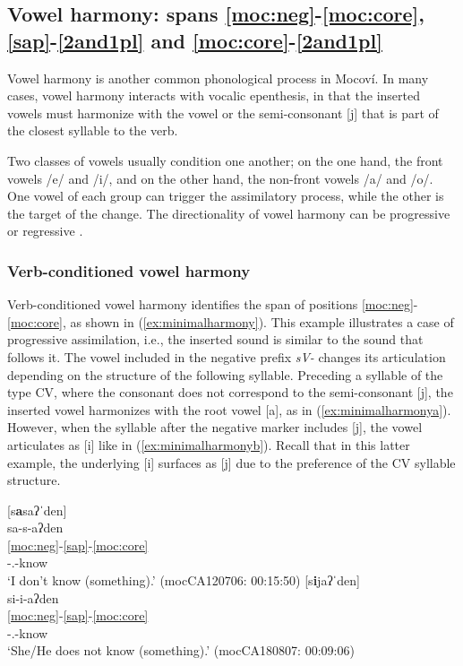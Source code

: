 \documentclass[output=paper]{langscibook}
\begin{document}
\subsection{Vowel harmony: spans \ref{moc:neg}-\ref{moc:core},  \ref{sap}-\ref{2and1pl} and \ref{moc:core}-\ref{2and1pl}}
\label{sec:vowel harmony}

 Vowel harmony is another common phonological process in Mocoví. In many cases, vowel harmony  interacts with vocalic epenthesis, in that the inserted vowels must harmonize with the vowel or the semi-consonant [j] that is part of the closest syllable to the verb.  %
 
 Two classes of vowels usually condition one another; on the one hand, the front vowels /e/ and /i/, and on the other hand, the non-front vowels /a/ and /o/. One vowel of each group can trigger the assimilatory process, while the other is the target of the change.  The directionality of vowel harmony can be progressive or regressive \citep[in the sense of][82]{Katamba1992}.

\subsubsection{Verb-conditioned vowel harmony}
Verb-conditioned vowel harmony identifies the span of positions \ref{moc:neg}-\ref{moc:core}, as shown in (\ref{ex:minimalharmony}). This example illustrates a case of progressive assimilation, i.e., the inserted sound is similar to the sound that follows it.  The vowel included in the negative prefix \textit{sV-} changes its articulation depending on the structure of the following syllable. Preceding a syllable of the type CV, where the consonant does not correspond to the semi-consonant [j], the inserted vowel harmonizes with the root vowel [a], as in (\ref{ex:minimalharmonya}). However, when the syllable after the negative marker includes [j], the vowel articulates as [i] like in (\ref{ex:minimalharmonyb}). Recall that in this latter example, the underlying [i] surfaces as [j] due to the preference of the CV syllable structure. 

\ea \label{ex:minimalharmony}
\ea \label{ex:minimalharmonya}
 [s\textbf{a}saʔˈden]\\
\glll sa-s-aʔden\\
\ref{moc:neg}-\ref{sap}-\ref{moc:core}\\
{\Neg}-{\First.\II}-know\\
\glt `I don't know (something).' \hfill(mocCA120706: 00:15:50)
\ex \label{ex:minimalharmonyb}
 [s\textbf{i}jaʔˈden]\\
\glll si-i-aʔden\\
\ref{moc:neg}-\ref{sap}-\ref{moc:core}\\
{\Neg}-{\Third.\II}-know\\
\glt `She/He does not know (something).' \hfill(mocCA180807: 00:09:06)
\z
\z 
\end{document}
